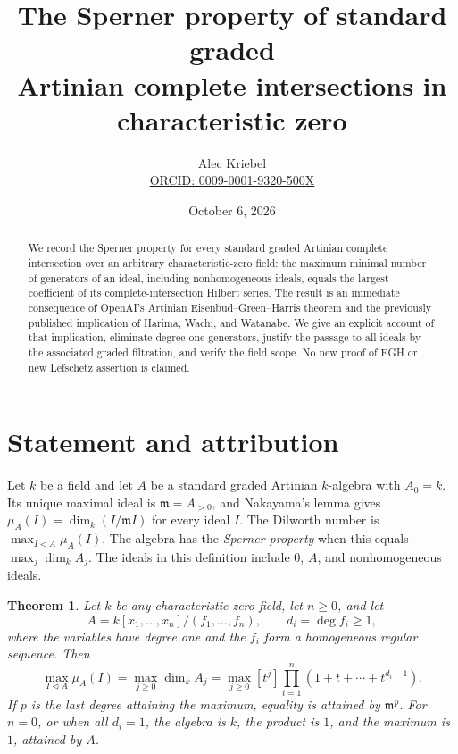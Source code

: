 \documentclass[11pt]{article}
\title{The Sperner property of standard graded\\Artinian complete intersections in characteristic zero}
\author{Alec Kriebel\\\small\href{https://orcid.org/0009-0001-9320-500X}{ORCID: 0009-0001-9320-500X}}
\date{October 6, 2026}
\newtheorem{theorem}{Theorem}
\newcommand{\m}{\mathfrak m}
\begin{document}
\maketitle
\begin{abstract}
We record the Sperner property for every standard graded Artinian complete
intersection over an arbitrary characteristic-zero field: the maximum
minimal number of generators of an ideal, including nonhomogeneous ideals,
equals the largest coefficient of its complete-intersection Hilbert
series. The result is an immediate consequence of OpenAI's Artinian
Eisenbud--Green--Harris theorem and the previously published implication
of Harima, Wachi, and Watanabe. We give an explicit account of that
implication, eliminate degree-one generators, justify the passage to all
ideals by the associated graded filtration, and verify the field scope.
No new proof of EGH or new Lefschetz assertion is claimed.
\end{abstract}

\section{Statement and attribution}
Let \(k\) be a field and let \(A\) be a standard graded Artinian
\(k\)-algebra with \(A_0=k\). Its unique maximal ideal is
\(\m=A_{>0}\), and Nakayama's lemma gives
\(\mu_A(I)=\dim_k(I/\m I)\) for every ideal \(I\).
The Dilworth number is \(\max_{I\triangleleft A}\mu_A(I)\).
The algebra has the \emph{Sperner property} when this equals
\(\max_j\dim_k A_j\). The ideals in this definition include \(0\),
\(A\), and nonhomogeneous ideals.

\begin{theorem}\label{thm:main}
Let \(k\) be any characteristic-zero field, let \(n\ge0\), and let
\[
 A=k[x_1,\ldots,x_n]/(f_1,\ldots,f_n),
 \qquad d_i=\deg f_i\ge1,
\]
where the variables have degree one and the \(f_i\) form a homogeneous
regular sequence. Then
\begin{equation}\label{eq:target}
 \max_{I\triangleleft A}\mu_A(I)
 =\max_{j\ge0}\dim_k A_j
 =\max_{j\ge0}[t^j]\prod_{i=1}^n(1+t+\cdots+t^{d_i-1}).
\end{equation}
If \(p\) is the last degree attaining the maximum, equality is attained
by \(\m^p\). For \(n=0\), or when all \(d_i=1\), the algebra is \(k\),
the product is \(1\), and the maximum is \(1\), attained by \(A\).
\end{theorem}
\end{document}
